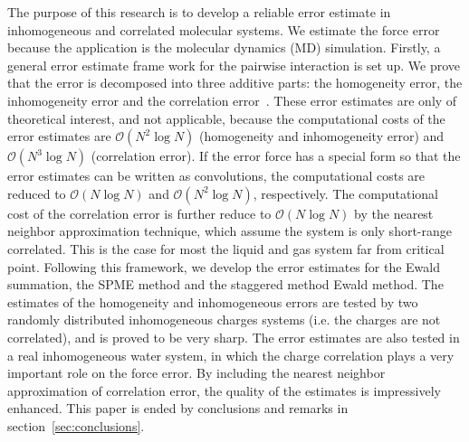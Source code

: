 \documentclass[aps,pre,preprint,unsortedaddress]{revtex4}
\begin{document}
The purpose of this research is to develop a reliable  error
estimate in inhomogeneous and correlated molecular systems.
We estimate the force error because the application is the molecular
dynamics (MD) simulation.  Firstly, a general error estimate
frame work for the pairwise interaction is set up. We prove that the
error is decomposed into three additive parts: the homogeneity error,
the inhomogeneity error and the correlation error~\cite{wang2012}.
These error estimates are only of theoretical interest, and
not applicable, because the computational costs of the error estimates
are $\mathcal O(N^2\log N)$ (homogeneity and inhomogeneity error)
and $\mathcal O(N^3\log N)$ (correlation error).
If the error force has a special form so that the error estimates
can be written as convolutions, the computational costs
are reduced to $\mathcal O(N\log N)$ and 
$\mathcal O(N^2\log N)$, respectively.
The computational cost of the correlation error is further
reduce to $\mathcal O(N\log N)$ by the nearest neighbor approximation
technique, which assume the system is only short-range correlated. This
is the case for most the liquid and gas system far from critical point.
Following this framework, we
develop the error estimates for the Ewald summation, the SPME method
and the staggered method Ewald method.   The estimates
of the homogeneity and inhomogeneous errors are tested by two
randomly distributed inhomogeneous charges systems
(i.e. the charges are not correlated), and is proved to
be very sharp.
The error estimates are also tested in a real inhomogeneous water system,
in which the charge correlation plays a very important role
on the force error. By 
including the nearest neighbor approximation of
correlation error, the quality of the estimates
is impressively enhanced.
This paper is ended by conclusions and remarks in
section~\ref{sec:conclusions}.



\end{document}
